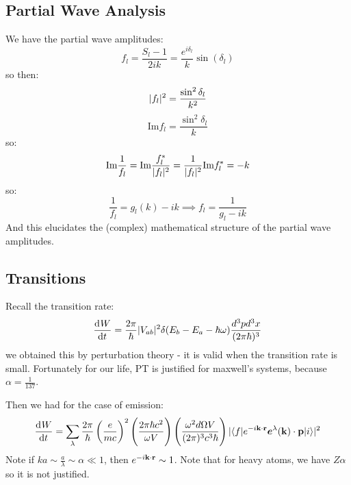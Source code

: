 \subsection{Partial Wave Analysis}
We have the partial wave amplitudes:
\begin{equation}
    f_l = \frac{S_l - 1}{2ik} = \frac{e^{i\delta_l}}{k}\sin(\delta_l)
\end{equation}
so then:
\begin{equation}
    \lvert f_l \rvert^2 = \frac{\sin^2\delta_l}{k^2}
\end{equation}
\begin{equation}
    \text{Im}f_l = \frac{\sin^2\delta_l}{k}
\end{equation}
so:
\begin{equation}
    \text{Im}\frac{1}{f_l} = \text{Im}\frac{f_l^*}{\lvert f_l \rvert^2} = \frac{1}{\lvert f_l \rvert^2}\text{Im}f_l^* = -k
\end{equation}
so:
\begin{equation}
    \frac{1}{f_l} = g_l(k) - ik \implies f_l = \frac{1}{g_l - ik}
\end{equation}
And this elucidates the (complex) mathematical structure of the partial wave amplitudes.

\subsection{Transitions}
Recall the transition rate:
\begin{equation}
    \dod{W}{t} = \frac{2\pi}{\hbar}\abs{V_{ab}}^2\delta(E_b - E_a - \hbar \omega)\frac{d^3pd^3x}{(2\pi\hbar)^3}
\end{equation}
we obtained this by perturbation theory - it is valid when the transition rate is small. Fortunately for our life, PT is justified for maxwell's systems, because $\alpha = \frac{1}{137}$.

Then we had for the case of emission:
\begin{equation}
    \dod{W}{t} = \sum_\lambda \frac{2\pi}{\hbar}\left(\frac{e}{mc}\right)^2 \left(\frac{2\pi \hbar c^2}{\omega V}\right)\left(\frac{\omega^2 d\Omega V}{(2\pi)^3 c^3 \hbar}\right)\abs{\bra{f}e^{-i\v{k} \cdot \v{r}}\gv{e}^{\lambda}(\v{k}) \cdot\v{p} \ket{i}}^2
\end{equation}
Note if $ka \sim \frac{a}{\lambda} \sim \alpha \ll 1$, then $e^{-i\mathbf{k} \cdot \mathbf{r}} \sim 1$. Note that for heavy atoms, we have $Z\alpha$ so it is not justified.

